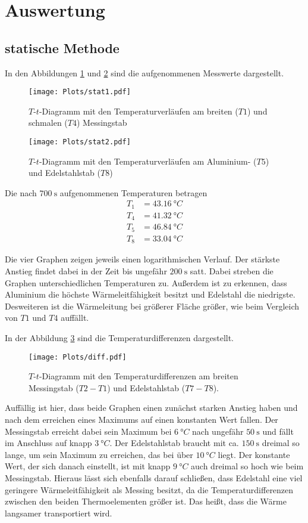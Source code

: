 \section{Auswertung}

\subsection{statische Methode \label{sec:stat}}

In den Abbildungen \ref{fig:stat1} und \ref{fig:stat2} sind die aufgenommenen Messwerte dargestellt.
\begin{figure}[H]
  \centering
  \texttt{[image: Plots/stat1.pdf]}
  \caption{$T$-$t$-Diagramm mit den Temperaturverläufen am breiten ($T1$) und schmalen ($T4$) Messingstab}
  \label{fig:stat1}
\end{figure}
\begin{figure}[H]
  \centering
  \texttt{[image: Plots/stat2.pdf]}
  \caption{$T$-$t$-Diagramm mit den Temperaturverläufen am Aluminium- ($T5$) und Edelstahlstab ($T8$)}
  \label{fig:stat2}
\end{figure}

Die nach $\SI{700}{\s}$ aufgenommenen Temperaturen betragen
\begin{align*}
  T_1 &= \SI{43,16}{°C} \\
  T_4 &= \SI{41,32}{°C} \\
  T_5 &= \SI{46,84}{°C} \\
  T_8 &= \SI{33,04}{°C}
\end{align*}

Die vier Graphen zeigen jeweils einen logarithmischen Verlauf. Der stärkste Anstieg findet dabei
in der Zeit bis ungefähr $\SI{200}{\s}$ satt.
Dabei streben die Graphen unterschiedlichen Temperaturen zu.
Außerdem ist zu erkennen, dass Aluminium die höchste Wärmeleitfähigkeit besitzt und Edelstahl die niedrigste.
Desweiteren ist die Wärmeleitung bei größerer Fläche größer, wie beim Vergleich von $T1$ und $T4$ auffällt.

In der Abbildung \ref{fig:diff} sind die Temperaturdifferenzen dargestellt.
\begin{figure}[H]
  \centering
  \texttt{[image: Plots/diff.pdf]}
  \caption{$T$-$t$-Diagramm mit den Temperaturdifferenzen am breiten Messingstab ($T2 - T1$) und Edelstahlstab ($T7 - T8$).}
  \label{fig:diff}
\end{figure}

Auffällig ist hier, dass beide Graphen einen zunächst starken Anstieg haben und nach dem erreichen eines Maximums
auf einen konstanten Wert fallen.
Der Messingstab erreicht dabei sein Maximum bei $\SI{6}{°C}$ nach ungefähr $\SI{50}{\s}$ und fällt
im Anschluss auf knapp $\SI{3}{°C}$. Der Edelstahlstab braucht mit ca. $\SI{150}{\s}$ dreimal so lange,
um sein Maximum zu erreichen, das bei über $\SI{10}{°C}$ liegt. Der konstante Wert, der sich danach einstellt,
ist mit knapp $\SI{9}{°C}$ auch dreimal so hoch wie beim Messingstab.
Hieraus lässt sich ebenfalls darauf schließen, dass Edelstahl eine viel geringere Wärmeleitfähigkeit als
Messing besitzt, da die Temperaturdifferenzen zwischen den beiden Thermoelementen größer ist.
Das heißt, dass die Wärme langsamer transportiert wird.

